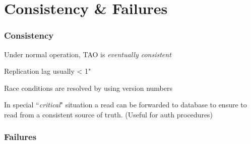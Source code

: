 \section{Consistency \& Failures}
\begin{frame}[t]\frametitle{Consistency}
	Under normal operation, TAO is \emph{eventually consistent}

	Replication lag usually < 1"

	Race conditions are resolved by using version numbers

	In special ``\emph{critical}" situation a read can be forwarded to database to ensure to read from a consistent source of truth. (Useful for auth procedures)


\end{frame}

\begin{frame}[c]\frametitle{Failures}
    


\end{frame}